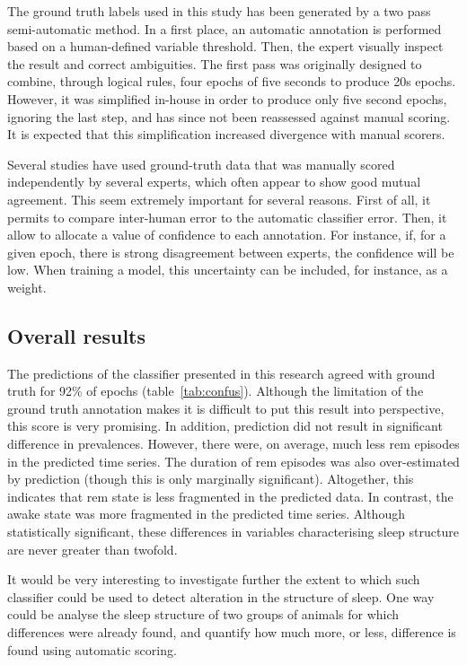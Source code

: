 The ground truth labels used in this study has been generated by a two pass semi-automatic method.
In a first place, an automatic annotation is performed based on a human-defined variable threshold.
Then, the expert visually inspect the result and correct ambiguities.
The first pass was originally designed to combine, through logical rules, four
epochs of five seconds to produce 20s
epochs\cite{costa-miserachs_automated_2003}.
However, it was simplified in-house in order to produce
only five second epochs, ignoring the last step, and has since not been reassessed against manual scoring.
It is expected that this simplification increased divergence with manual scorers.

Several studies have used ground-truth data that was manually scored independently by several experts,
which often appear to show good mutual agreement.
This seem extremely important for several reasons.
First of all, it permits to compare inter-human error to the automatic classifier error.
Then, it allow to allocate a value of confidence to each annotation.
For instance, if, for a given epoch, there is strong disagreement between experts, the confidence will be low.
When training a model, this uncertainty can be included, for instance, as a weight.

\subsection{Overall results}
The predictions of the classifier presented in this research agreed with ground truth for 92\% of epochs (table~\ref{tab:confus}).
Although the limitation of the ground truth annotation makes it is difficult to
put this result into perspective, this score is very promising.
In addition, prediction did not result in significant difference in prevalences.
However, there were, on average, much less \gls{rem} episodes in the predicted time series.
The duration of \gls{rem} episodes was also over-estimated by prediction (though this is only marginally significant).
Altogether, this indicates that \gls{rem} state is less fragmented in the predicted data.
In contrast, the awake state was more fragmented in the predicted time series.
Although statistically significant, these differences in variables characterising sleep structure are never greater than twofold.

It would be very interesting to investigate further the extent to which such classifier could be used to detect alteration
in the structure of sleep.
One way could be analyse the sleep structure of two groups of animals for which differences were already found, and quantify how much more, or less,
difference is found using automatic scoring.


